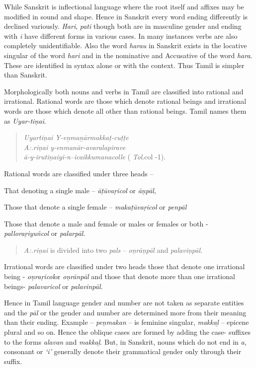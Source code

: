While Sanskrit is inflectional language where the root itself and affixes may be modified in sound and shape. Hence in Sanskrit every word ending differently is declined variously. \textit{Hari}, \textit{pati} though both are in masculine gender and ending with \textit{i} have different forms in various cases. In many instances verbs are also completely unidentifiable. Also the word \textit{harau} in Sanskrit exists in the locative singular of the word \textit{hari} and in the nominative and Accusative of the word \textit{hara}. These are identified in syntax alone or with the context. Thus Tamil is simpler than Sanskrit.

Morphologically both nouns and verbs in Tamil are classified into rational and irrational. Rational words are those which denote rational beings and irrational words are those which denote all other than rational beings. Tamil names them as \textit{Uyar-tiṇai}.

\begin{verse}
\textit{Uyartiṇai Y-eṉmaṉārmakkaṭ-cuṭṭe}\\\textit{ A:.riṇai y-enmanār-avaralapirave}\\\textit{ā-y-irutiṇaiyi-n--icaikkumanacolle} ( \textit{Tol}.col -1).
\end{verse}

Rational words are classified under three heads –

That denoting a single male – \textit{āṭūvaṛicol} or \textit{āṇpāl},

Those that denote a single female – \textit{makaṭūvaṛicol} or \textit{penpāl}

 Those that denote a male and female or males or females or both - \textit{palloraṛiyuñcol} or \textit{palarpāl}.

\begin{verse}
\textit{A:.riṇai} is divided into two \textit{pals} – \textit{oṇrāṇpāl} and \textit{palaviṇpāl.}
\end{verse}

Irrational words are classified under two heads those that denote one irrational being - \textit{oṇraṛicol}or \textit{oṇrānpāl} and those that denote more than one irrational beings- \textit{palavaricol} or \textit{palavinpāl}.

\vskip 2pt

Hence in Tamil language gender and number are not taken as separate entities and the \textit{pāl} or the gender and number are determined more from their meaning than their ending. Example – \textit{peṇmakan} – is feminine singular, \textit{makkaḻ} – epicene plural and so on. Hence the oblique cases are formed by adding the case- suffixes to the forms \textit{alavan} and \textit{makkaḻ}. But, in Sanskrit, nouns which do not end in \textit{a,} consonant or \textit{‘i’} generally denote their grammatical gender only through their suffix.


